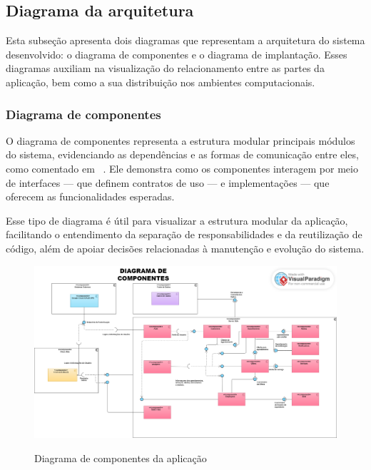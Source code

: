\subsection{Diagrama da arquitetura}

Esta subseção apresenta dois diagramas que representam a arquitetura do sistema desenvolvido: o diagrama de componentes e o diagrama de implantação. Esses diagramas auxiliam na visualização do relacionamento entre as partes da aplicação, bem como a sua distribuição nos ambientes computacionais.

\subsubsection{Diagrama de componentes}

O diagrama de componentes representa a estrutura modular principais módulos do sistema, evidenciando as dependências e as formas de comunicação entre eles, como comentado em ~\cite{Booch2005}. Ele demonstra como os componentes interagem por meio de interfaces — que definem contratos de uso — e implementações — que oferecem as funcionalidades esperadas.

Esse tipo de diagrama é útil para visualizar a estrutura modular da aplicação, facilitando o entendimento da separação de responsabilidades e da reutilização de código, além de apoiar decisões relacionadas à manutenção e evolução do sistema.

\begin{figure}[htb]
  \centering
  \caption{Diagrama de componentes da aplicação}
  \includegraphics[width=\textwidth]{cap04-desenvolvimento/images/4-3-2-1-diagrama-componentes}
  \label{fig:diagrama-componente}
\end{figure}
\FloatBarrier


